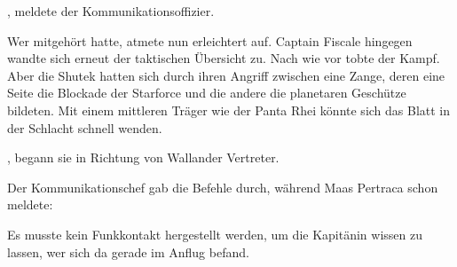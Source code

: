 \par

, meldete der Kommunikationsoffizier. 

\par

Wer mitgehört hatte, atmete nun erleichtert auf. Captain Fiscale hingegen wandte sich erneut der taktischen Übersicht zu. Nach wie vor tobte der Kampf. Aber die Shutek hatten sich durch ihren Angriff zwischen eine Zange, deren eine Seite die Blockade der Starforce und die andere die planetaren Geschütze bildeten. Mit einem mittleren Träger wie der Panta Rhei könnte sich das Blatt in der Schlacht schnell wenden.

\par

, begann sie in Richtung von Wallander Vertreter. 

\par

Der Kommunikationschef gab die Befehle durch, während Maas Pertraca schon meldete: 

\par

Es musste kein Funkkontakt hergestellt werden, um die Kapitänin wissen zu lassen, wer sich da gerade im Anflug befand.

\par

